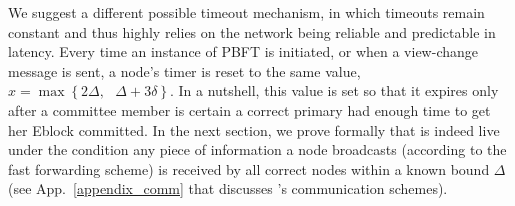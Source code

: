 We suggest a different possible timeout mechanism, in which timeouts remain constant and thus highly relies on the network being reliable and predictable in latency. Every time an instance of PBFT is initiated, or when a view-change message is sent, a node's timer is reset to the same value, $x = \max \left\{ 2\Delta, \text{ } \Delta+3\delta \right\}$. In a nutshell, this value is set so that it expires only after a committee member is certain a correct primary had enough time to get her Eblock committed. In the next section, we prove formally that \name is indeed live under the condition any piece of information a node broadcasts (according to the fast forwarding scheme) is received by all correct nodes within a known bound $\Delta$ (see App.~\ref{appendix_comm} that discusses \nameNS's communication schemes).    

